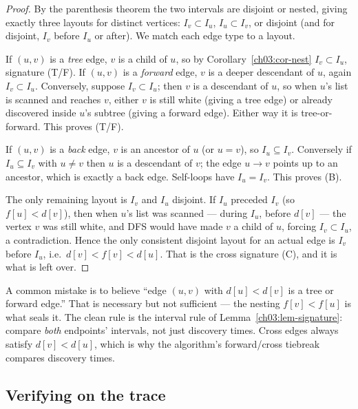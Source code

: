 \begin{proof}
By the parenthesis theorem the two intervals are disjoint or nested, giving exactly three layouts for distinct vertices: $I_v\subset I_u$, $I_u\subset I_v$, or disjoint (and for disjoint, $I_v$ before $I_u$ or after). We match each edge type to a layout.

If $(u,v)$ is a \emph{tree} edge, $v$ is a child of $u$, so by Corollary~\ref{ch03:cor-nest} $I_v\subset I_u$, signature (T/F). If $(u,v)$ is a \emph{forward} edge, $v$ is a deeper descendant of $u$, again $I_v\subset I_u$. Conversely, suppose $I_v\subset I_u$; then $v$ is a descendant of $u$, so when $u$'s list is scanned and reaches $v$, either $v$ is still white (giving a tree edge) or already discovered inside $u$'s subtree (giving a forward edge). Either way it is tree-or-forward. This proves (T/F).

If $(u,v)$ is a \emph{back} edge, $v$ is an ancestor of $u$ (or $u=v$), so $I_u\subseteq I_v$. Conversely if $I_u\subseteq I_v$ with $u\ne v$ then $u$ is a descendant of $v$; the edge $u\to v$ points up to an ancestor, which is exactly a back edge. Self-loops have $I_u=I_v$. This proves (B).

The only remaining layout is $I_v$ and $I_u$ disjoint. If $I_u$ preceded $I_v$ (so $f[u]<d[v]$), then when $u$'s list was scanned --- during $I_u$, before $d[v]$ --- the vertex $v$ was still white, and DFS would have made $v$ a child of $u$, forcing $I_v\subset I_u$, a contradiction. Hence the only consistent disjoint layout for an actual edge is $I_v$ before $I_u$, i.e.\ $d[v]<f[v]<d[u]$. That is the cross signature (C), and it is what is left over.
\end{proof}

\begin{trapbox}
A common mistake is to believe ``edge $(u,v)$ with $d[u]<d[v]$ is a tree or forward edge.'' That is necessary but not sufficient --- the nesting $f[v]<f[u]$ is what seals it. The clean rule is the interval rule of Lemma~\ref{ch03:lem-signature}: compare \emph{both} endpoints' intervals, not just discovery times. Cross edges always satisfy $d[v]<d[u]$, which is why the algorithm's forward/cross tiebreak compares discovery times.
\end{trapbox}

\subsection{Verifying on the trace}

